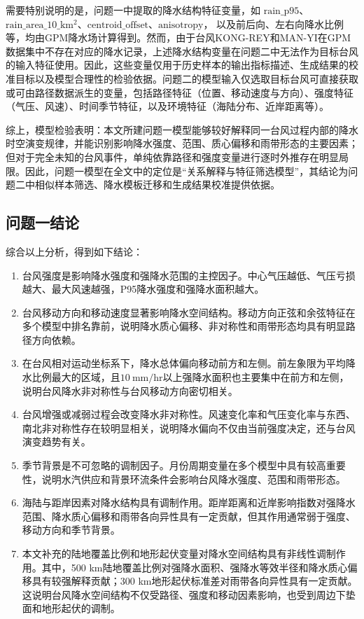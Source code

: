 \documentclass[UTF8,a4paper,zihao=5,fontset=fandol]{ctexart}
\numberwithin{equation}{section}
\numberwithin{figure}{section}
\numberwithin{table}{section}
\begin{document}
需要特别说明的是，问题一中提取的降水结构特征变量，如
$\mathrm{rain\_p95}$、$\mathrm{rain\_area\_10\_km^2}$、$\mathrm{centroid\_offset}$、$\mathrm{anisotropy}$，
以及前后向、左右向降水比例等，均由GPM降水场计算得到。然而，由于台风KONG-REY和MAN-YI在GPM数据集中不存在对应的降水记录，上述降水结构变量在问题二中无法作为目标台风的输入特征使用。因此，这些变量仅用于历史样本的输出指标描述、生成结果的校准目标以及模型合理性的检验依据。问题二的模型输入仅选取目标台风可直接获取或可由路径数据派生的变量，包括路径特征（位置、移动速度与方向）、强度特征（气压、风速）、时间季节特征，以及环境特征（海陆分布、近岸距离等）。

综上，模型检验表明：本文所建问题一模型能够较好解释同一台风过程内部的降水时空演变规律，并能识别影响降水强度、范围、质心偏移和雨带形态的主要因素；但对于完全未知的台风事件，单纯依靠路径和强度变量进行逐时外推存在明显局限。因此，问题一模型在全文中的定位是“关系解释与特征筛选模型”，其结论为问题二中相似样本筛选、降水模板迁移和生成结果校准提供依据。


\subsection{问题一结论}

综合以上分析，得到如下结论：

\begin{enumerate}
    \item 台风强度是影响降水强度和强降水范围的主控因子。中心气压越低、气压亏损越大、最大风速越强，P95降水强度和强降水面积越大。
    \item 台风移动方向和移动速度显著影响降水空间结构。移动方向正弦和余弦特征在多个模型中排名靠前，说明降水质心偏移、非对称性和雨带形态均具有明显路径方向依赖。
    \item 在台风相对运动坐标系下，降水总体偏向移动前方和左侧。前左象限为平均降水比例最大的区域，且$10\ \mathrm{mm/hr}$以上强降水面积也主要集中在前方和左侧，说明台风降水非对称性与台风移动方向密切相关。
    \item 台风增强或减弱过程会改变降水非对称性。风速变化率和气压变化率与东西、南北非对称性存在较明显相关，说明降水偏向不仅由当前强度决定，还与台风演变趋势有关。
    \item 季节背景是不可忽略的调制因子。月份周期变量在多个模型中具有较高重要性，说明水汽供应和背景环流条件会影响台风降水强度、范围和雨带形态。
    \item 海陆与距岸因素对降水结构具有调制作用。距岸距离和近岸影响指数对强降水范围、降水质心偏移和雨带各向异性具有一定贡献，但其作用通常弱于强度、移动方向和季节背景。
    \item 本文补充的陆地覆盖比例和地形起伏变量对降水空间结构具有非线性调制作用。其中，500 km陆地覆盖比例对强降水面积、强降水等效半径和降水质心偏移具有较强解释贡献；300 km地形起伏标准差对雨带各向异性具有一定贡献。这说明台风降水空间结构不仅受路径、强度和移动因素影响，也受到周边下垫面和地形起伏的调制。
\end{enumerate}
\end{document}
